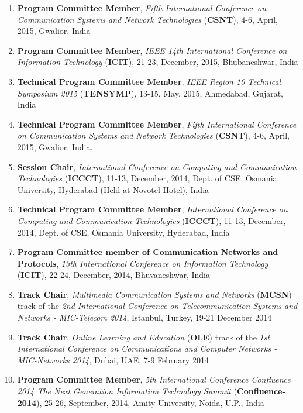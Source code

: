 \begin{enumerate}
\item
\textbf{Program Committee Member},  \textit{Fifth International Conference on Communication Systems and Network Technologies }(\textbf{CSNT}), 4-6, April, 2015, Gwalior, India

\item
\textbf{Program Committee Member}, \textit{IEEE 14th International Conference on Information Technology} (\textbf{ICIT}), 21-23, December, 2015, Bhubaneshwar, India

\item
\textbf{Technical Program Committee Member}, \textit{IEEE Region 10 Technical Symposium 2015} (\textbf{TENSYMP}), 13-15, May, 2015, Ahmedabad, Gujarat, India

\item
\textbf{Technical Program Committee Member}, \textit{Fifth International Conference on Communication Systems and Network Technologies} (\textbf{CSNT}), 4-6, April, 2015, Gwalior, India.

\item
\textbf{Session Chair}, \textit{International Conference on Computing and Communication Technologies} (\textbf{ICCCT}), 11-13, December, 2014, Dept. of CSE, Osmania University, Hyderabad (Held at Novotel Hotel), India

\item
\textbf{Technical Program Committee Member}, \textit{International Conference on Computing and Communication Technologies }(\textbf{ICCCT}), 11-13, December, 2014, Dept. of CSE, Osmania University, Hyderabad, India

\item
\textbf{Program Committee member of Communication Networks and Protocols}, \textit{13th International Conference on Information Technology} (\textbf{ICIT}), 22-24, December, 2014, Bhuvaneshwar, India

\item
\textbf{Track Chair}, \textit{Multimedia Communication Systems and Networks }(\textbf{MCSN}) track of the \textit{2nd International Conference on Telecommunication Systems and Networks - MIC-Telecom 2014}, Istanbul, Turkey, 19-21 December 2014 

\item
\textbf{Track Chair}, \textit{Online Learning and Education} (\textbf{OLE}) track of the \textit{1st International Conference on Communications and Computer Networks - MIC-Networks 2014}, Dubai, UAE, 7-9 February 2014

\item
\textbf{Program Committee Member}, \textit{5th International Conference Confluence 2014 The Next Generation Information Technology Summit} (\textbf{Confluence-2014}), 25-26, September, 2014, Amity University, Noida, U.P., India


\end{enumerate}
